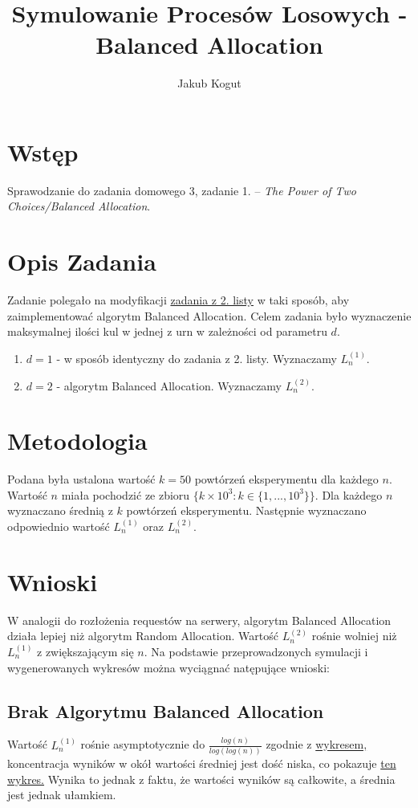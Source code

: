 \documentclass{article}
\title{Symulowanie Procesów Losowych - Balanced Allocation}
\author{Jakub Kogut}
\date{}
\begin{document}
\maketitle

\section{Wstęp}
Sprawodzanie do zadania domowego 3, zadanie 1. -- \textit{The Power of Two Choices/Balanced Allocation}.
\section{Opis Zadania}
Zadanie polegało na modyfikacji \href{https://github.com/niooch/ballsAndBins}{zadania z 2. listy} w taki sposób, aby zaimplementować algorytm Balanced Allocation. \newline
Celem zadania było wyznaczenie maksymalnej ilości kul w jednej z urn w zależności od parametru $d$.
\begin{enumerate}
    \item $d=1$ - w sposób identyczny do zadania z 2. listy. Wyznaczamy $L_n^{(1)}$.
    \item $d=2$ - algorytm Balanced Allocation. Wyznaczamy $L_n^{(2)}$.
\end{enumerate}
\section{Metodologia}
Podana była ustalona wartość $k=50$ powtórzeń eksperymentu dla każdego $n$. Wartość $n$ miała pochodzić ze zbioru $\{k \times 10^3: k \in \{1, ..., 10^3\}\}$. Dla każdego $n$ wyznaczano średnią z $k$ powtórzeń eksperymentu. Następnie wyznaczano odpowiednio wartość $L_n^{(1)}$ oraz $L_n^{(2)}$.
\section{Wnioski}
W analogii do rozłożenia requestów na serwery, algorytm Balanced Allocation działa lepiej niż algorytm Random Allocation. Wartość $L_n^{(2)}$ rośnie wolniej niż $L_n^{(1)}$ z zwiększającym się $n$. \newline
Na podstawie przeprowadzonych symulacji i wygenerowanych wykresów można wyciągnać natępujące wnioski:
\subsection{Brak Algorytmu Balanced Allocation}
Wartość $L_n^{(1)}$ rośnie asymptotycznie do $\frac{log(n)}{log(log(n))}$ zgodnie z \hyperref[fig:Ln1]{wykresem,} koncentracja wyników w okół wartości średniej jest dość niska, co pokazuje \hyperref[fig:LnA]{ten wykres.} Wynika to jednak z faktu, że wartości wyników są całkowite, a średnia jest jednak ułamkiem.
\end{document}
